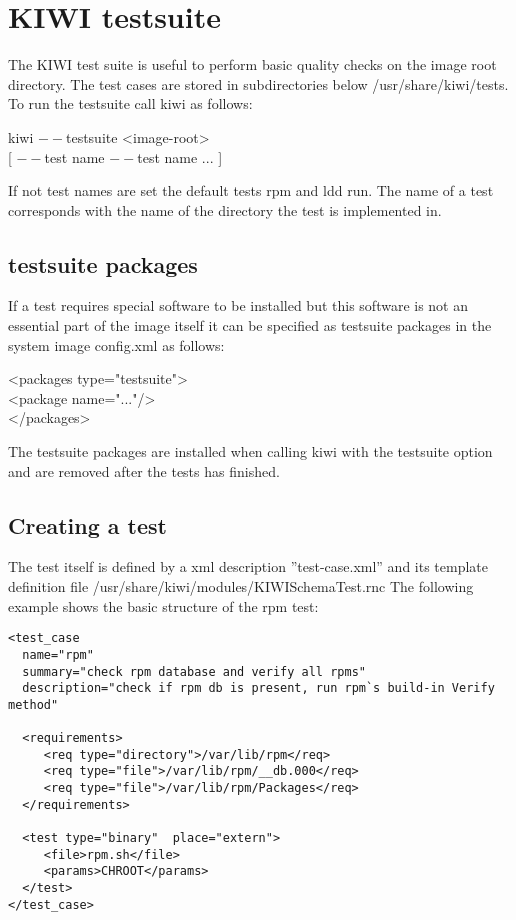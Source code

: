 \chapter{KIWI testsuite}
\label{chapter:testing}
\minitoc

The KIWI test suite is useful to perform basic quality checks on
the image root directory. The test cases are stored in subdirectories
below /usr/share/kiwi/tests. To run the testsuite call kiwi as
follows:

\begin{Command}{12cm}
 kiwi $--$testsuite <image-root> \bs \\
\hspace*{1cm}[ $--$test name $--$test name ... ]
\end{Command}

If not test names are set the default tests rpm and ldd run.
The name of a test corresponds with the name of the directory
the test is implemented in.

\section{testsuite packages}
If a test requires special software to be installed but this
software is not an essential part of the image itself it can be
specified as testsuite packages in the system image config.xml
as follows:

\begin{Command}{12cm}
<packages type="testsuite">\\
\hspace*{1cm}<package name="..."/>\\
</packages>
\end{Command}

The testsuite packages are installed when calling kiwi with
the testsuite option and are removed after the tests has
finished.

\section{Creating a test}
The test itself is defined by a xml description ''test-case.xml''
and its template definition file /usr/share/kiwi/modules/KIWISchemaTest.rnc
The following example shows the basic structure of the rpm test:

\begin{verbatim}
<test_case 
  name="rpm"
  summary="check rpm database and verify all rpms"
  description="check if rpm db is present, run rpm`s build-in Verify method"

  <requirements>
     <req type="directory">/var/lib/rpm</req>
     <req type="file">/var/lib/rpm/__db.000</req>
     <req type="file">/var/lib/rpm/Packages</req>
  </requirements>

  <test type="binary"  place="extern">
     <file>rpm.sh</file>
     <params>CHROOT</params>
  </test>
</test_case>
\end{verbatim}

